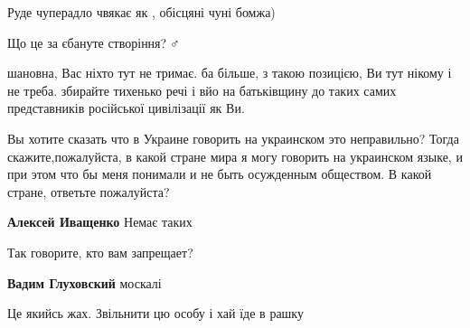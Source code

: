 \begin{itemize}

Руде чуперадло чвякає як , обісцяні чуні бомжа)


Що це за єбануте створіння?🤦♂️


шановна, Вас ніхто тут не тримає. ба більше, з такою позицією, Ви тут нікому і
не треба. збирайте тихенько речі і вйо на батьківщину до таких самих
представників російської цивілізації як Ви.




Вы хотите сказать что в Украине говорить на украинском это неправильно? Тогда
скажите,пожалуйста, в какой стране мира я могу говорить на украинском языке, и
при этом что бы меня понимали и не быть осужденным обществом. В какой стране,
ответьте пожалуйста?

\begin{itemize}

\textbf{Алексей Иващенко} Немає таких 🙁


Так говорите, кто вам запрещает?


\textbf{Вадим Глуховский} москалі
\end{itemize}


Це якийсь жах. Звільнити цю особу і хай їде в рашку



\end{itemize}
